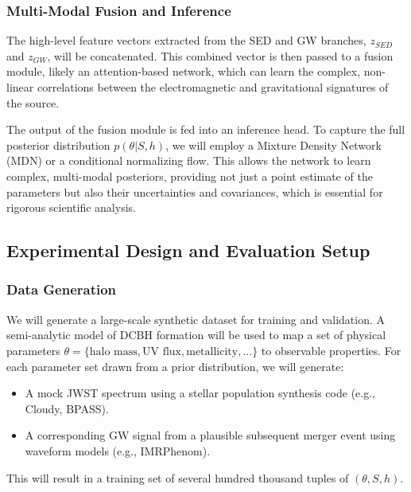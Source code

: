 \documentclass[11pt, a4paper]{article}
\begin{document}
\subsubsection{Multi-Modal Fusion and Inference}
The high-level feature vectors extracted from the SED and GW branches, $z_{SED}$ and $z_{GW}$, will be concatenated. This combined vector is then passed to a fusion module, likely an attention-based network, which can learn the complex, non-linear correlations between the electromagnetic and gravitational signatures of the source.

The output of the fusion module is fed into an inference head. To capture the full posterior distribution $p(\theta | S, h)$, we will employ a Mixture Density Network (MDN) or a conditional normalizing flow. This allows the network to learn complex, multi-modal posteriors, providing not just a point estimate of the parameters but also their uncertainties and covariances, which is essential for rigorous scientific analysis.

\subsection{Experimental Design and Evaluation Setup}

\subsubsection{Data Generation}
We will generate a large-scale synthetic dataset for training and validation. A semi-analytic model of DCBH formation will be used to map a set of physical parameters $\theta = \{\text{halo mass}, \text{UV flux}, \text{metallicity}, ...\}$ to observable properties. For each parameter set drawn from a prior distribution, we will generate:
\begin{itemize}
    \item A mock JWST spectrum using a stellar population synthesis code (e.g., Cloudy, BPASS).
    \item A corresponding GW signal from a plausible subsequent merger event using waveform models (e.g., IMRPhenom).
\end{itemize}
This will result in a training set of several hundred thousand tuples of $(\theta, S, h)$.
\end{document}
